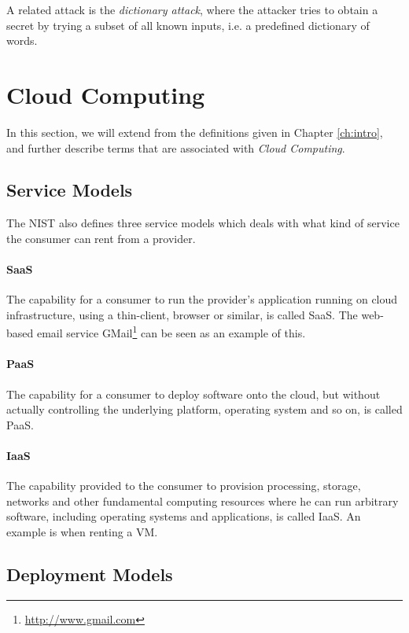 \documentclass[pdftex,english,10pt,b5paper,twoside]{book}
\begin{document}
A related attack is the \emph{dictionary attack}, where the attacker
tries to obtain a secret by trying a subset of all known inputs, i.e. a
predefined dictionary of words.

\section{Cloud Computing}

In this section, we will extend from the definitions given in Chapter
\ref{ch:intro}, and further describe terms that are associated with
\emph{Cloud Computing}.

\subsection{Service Models}
The \ac{NIST} also defines three service models which deals with what kind of
service the consumer can rent from a provider.

\paragraph{\ac{SaaS}} The capability for a consumer to run the provider's
application running on cloud infrastructure, using a thin-client, browser or
similar, is called \ac{SaaS}. The web-based email service
GMail\footnote{\url{http://www.gmail.com}} can be seen as an example of this.

\paragraph{\ac{PaaS}} The capability for a consumer to deploy software onto
the cloud, but without actually controlling the underlying platform, operating
system and so on, is called \ac{PaaS}.

\paragraph{\ac{IaaS}} The capability provided to the consumer to provision
processing, storage, networks and other fundamental computing resources where
he can run arbitrary software, including operating systems and applications, is
called \ac{IaaS}. An example is when renting a \ac{VM}.

\subsection{Deployment Models}
\end{document}
